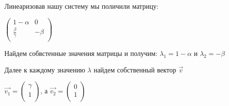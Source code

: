 Линеаризовав нашу систему мы поличили матрицу:

$\left(
\begin{array}{cc}
 1-\alpha  & 0 \\
 \frac{\beta }{\gamma } & -\beta  \\
\end{array}
\right)$

Найдем собвстенные значения матрицы и получим: 
$\lambda_1 = 1-\alpha $ и $\lambda_2 = -\beta$ 

Далее к каждому значению $\lambda$ найдем собственный вектор $\vec{v}$

$\vec{v_1} = \left(
\begin{array}{c}
 \gamma  \\
 1 \\
\end{array}
\right)$, а 
$\vec{v_2} = \left(
\begin{array}{c}
 0  \\
 1 \\
\end{array}
\right)$
